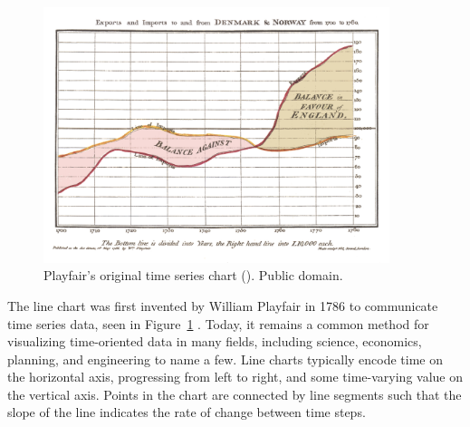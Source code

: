 \begin{figure}[h]
	\centering
	\includegraphics[width=0.9\textwidth]{figures/png/PlayfairTimeSeries.png}
	\caption[Playfair's original time series chart]{Playfair's original time series chart (\citeyear{playfair}).  Public domain.}
	\label{fig:playfair}
\end{figure}

The line chart was first invented by William Playfair in 1786 to communicate time series data, seen in Figure~\ref{fig:playfair} \cite{playfair}.  Today, it remains a common method for visualizing time-oriented data in many fields, including science, economics, planning, and engineering to name a few.  Line charts typically encode time on the horizontal axis, progressing from left to right, and some time-varying value on the vertical axis.  Points in the chart are connected by line segments such that the slope of the line indicates the rate of change between time steps.  

